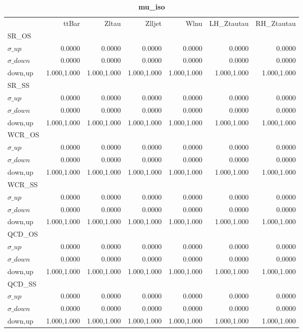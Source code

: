 \documentclass[11pt,oneside,a4paper]{article}
\begin{document}
\begin{table}
\centering
\caption{\bf{mu\_iso}}
\begin{tabular}{lrrrrrr}
 & ttBar & Zltau & Zlljet & Wlnu & LH\_Ztautau & RH\_Ztautau \\
SR\_OS &  &  &  &  &  &  \\
$\sigma\_up$ & 0.0000 & 0.0000 & 0.0000 & 0.0000 & 0.0000 & 0.0000 \\
$\sigma\_down$ & 0.0000 & 0.0000 & 0.0000 & 0.0000 & 0.0000 & 0.0000 \\
down,up & 1.000,1.000 & 1.000,1.000 & 1.000,1.000 & 1.000,1.000 & 1.000,1.000 & 1.000,1.000 \\

\hline
SR\_SS &  &  &  &  &  &  \\
$\sigma\_up$ & 0.0000 & 0.0000 & 0.0000 & 0.0000 & 0.0000 & 0.0000 \\
$\sigma\_down$ & 0.0000 & 0.0000 & 0.0000 & 0.0000 & 0.0000 & 0.0000 \\
down,up & 1.000,1.000 & 1.000,1.000 & 1.000,1.000 & 1.000,1.000 & 1.000,1.000 & 1.000,1.000 \\

\hline
WCR\_OS &  &  &  &  &  &  \\
$\sigma\_up$ & 0.0000 & 0.0000 & 0.0000 & 0.0000 & 0.0000 & 0.0000 \\
$\sigma\_down$ & 0.0000 & 0.0000 & 0.0000 & 0.0000 & 0.0000 & 0.0000 \\
down,up & 1.000,1.000 & 1.000,1.000 & 1.000,1.000 & 1.000,1.000 & 1.000,1.000 & 1.000,1.000 \\

\hline
WCR\_SS &  &  &  &  &  &  \\
$\sigma\_up$ & 0.0000 & 0.0000 & 0.0000 & 0.0000 & 0.0000 & 0.0000 \\
$\sigma\_down$ & 0.0000 & 0.0000 & 0.0000 & 0.0000 & 0.0000 & 0.0000 \\
down,up & 1.000,1.000 & 1.000,1.000 & 1.000,1.000 & 1.000,1.000 & 1.000,1.000 & 1.000,1.000 \\

\hline
QCD\_OS &  &  &  &  &  &  \\
$\sigma\_up$ & 0.0000 & 0.0000 & 0.0000 & 0.0000 & 0.0000 & 0.0000 \\
$\sigma\_down$ & 0.0000 & 0.0000 & 0.0000 & 0.0000 & 0.0000 & 0.0000 \\
down,up & 1.000,1.000 & 1.000,1.000 & 1.000,1.000 & 1.000,1.000 & 1.000,1.000 & 1.000,1.000 \\

\hline
QCD\_SS &  &  &  &  &  &  \\
$\sigma\_up$ & 0.0000 & 0.0000 & 0.0000 & 0.0000 & 0.0000 & 0.0000 \\
$\sigma\_down$ & 0.0000 & 0.0000 & 0.0000 & 0.0000 & 0.0000 & 0.0000 \\
down,up & 1.000,1.000 & 1.000,1.000 & 1.000,1.000 & 1.000,1.000 & 1.000,1.000 & 1.000,1.000 \\

\hline
\end{tabular}
\end{table}
\end{document}

